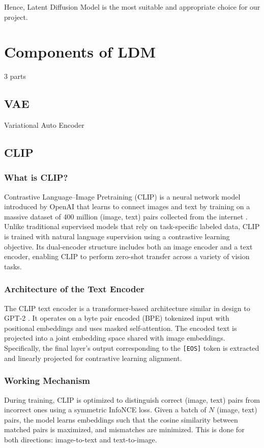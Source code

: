 Hence, Latent Diffusion Model is the most suitable and appropriate choice for our project. 

\section{Components of LDM}

3 parts

\subsection{VAE}

Variational Auto Encoder

\subsection{CLIP}

\subsubsection{What is CLIP?}
Contrastive Language–Image Pretraining (CLIP) is a neural network model introduced by OpenAI that learns to connect images and text by training on a massive dataset of 400 million (image, text) pairs collected from the internet \cite{radford2021learningtransferablevisualmodels}. Unlike traditional supervised models that rely on task-specific labeled data, CLIP is trained with natural language supervision using a contrastive learning objective. Its dual-encoder structure includes both an image encoder and a text encoder, enabling CLIP to perform zero-shot transfer across a variety of vision tasks.

\subsubsection{Architecture of the Text Encoder}
The CLIP text encoder is a transformer-based architecture similar in design to GPT-2 \cite{radford2021learningtransferablevisualmodels}. It operates on a byte pair encoded (BPE) tokenized input with positional embeddings and uses masked self-attention. The encoded text is projected into a joint embedding space shared with image embeddings. Specifically, the final layer's output corresponding to the \texttt{[EOS]} token is extracted and linearly projected for contrastive learning alignment.

\subsubsection{Working Mechanism}
During training, CLIP is optimized to distinguish correct (image, text) pairs from incorrect ones using a symmetric InfoNCE loss. Given a batch of $N$ (image, text) pairs, the model learns embeddings such that the cosine similarity between matched pairs is maximized, and mismatches are minimized. This is done for both directions: image-to-text and text-to-image.

